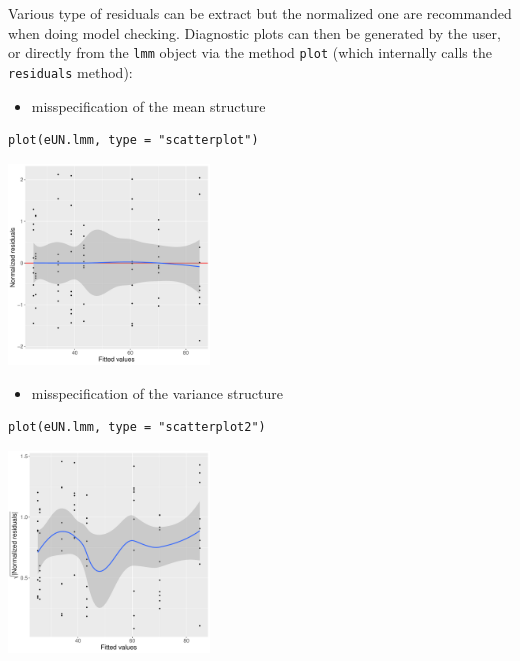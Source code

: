 \documentclass[12pt]{article}
\begin{document}
Various type of residuals can be extract but the normalized one are
recommanded when doing model checking. Diagnostic plots can then be
generated by the user, or directly from the \texttt{lmm} object via the
method \texttt{plot} (which internally calls the \texttt{residuals} method):
\begin{itemize}
\item misspecification of the mean structure
\end{itemize}
\lstset{language=r,label= ,caption= ,captionpos=b,numbers=none}
\begin{lstlisting}
plot(eUN.lmm, type = "scatterplot")
\end{lstlisting}

\begin{center}
\includegraphics[width=0.4\textwidth]{./figures/diag-scatterplot.pdf}
\end{center}

\clearpage

\begin{itemize}
\item misspecification of the variance structure
\end{itemize}
\lstset{language=r,label= ,caption= ,captionpos=b,numbers=none}
\begin{lstlisting}
plot(eUN.lmm, type = "scatterplot2")
\end{lstlisting}

\begin{center}
\includegraphics[width=0.4\textwidth]{./figures/diag-scatterplot2.pdf}
\end{center}
\end{document}
